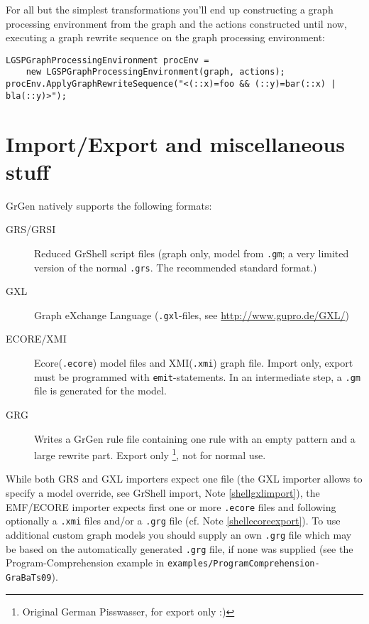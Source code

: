 \begin{example}
For all but the simplest transformations you'll end up constructing a graph processing environment from the graph and the actions constructed until now, executing a graph rewrite sequence on the graph processing environment:
\begin{verbatim}
LGSPGraphProcessingEnvironment procEnv = 
    new LGSPGraphProcessingEnvironment(graph, actions);
procEnv.ApplyGraphRewriteSequence("<(::x)=foo && (::y)=bar(::x) | bla(::y)>");
\end{verbatim}
\end{example}

\section{Import/Export and miscellaneous stuff}\label{sub:imexport}

GrGen natively supports the following formats:
\begin{description}
  \item[GRS/GRSI] Reduced GrShell script files (graph only, model from \texttt{.gm}; a very limited version of the normal \texttt{.grs}. The recommended standard format.)
  \item[GXL] Graph eXchange Language (\texttt{.gxl}-files, see \url{http://www.gupro.de/GXL/})
  \item[ECORE/XMI] Ecore(\texttt{.ecore}) model files and XMI(\texttt{.xmi}) graph file. Import only, export must be programmed with \texttt{emit}-statements. In an intermediate step, a \texttt{.gm} file is generated for the model.
    \item[GRG] Writes a GrGen rule file containing one rule with an empty pattern and a large rewrite part. Export only \footnote{Original German Pisswasser, for export only :)}, not for normal use.
\end{description}

While both GRS and GXL importers expect one file
(the GXL importer allows to specify a model override, see GrShell import, Note \ref{shellgxlimport}),
the EMF/ECORE importer expects first one or more \texttt{.ecore} files
and following optionally a \texttt{.xmi} files and/or a \texttt{.grg} file (cf. Note \ref{shellecoreexport}). 
To use additional custom graph models you should supply an own \texttt{.grg}
file which may be based on the automatically generated \texttt{.grg} file, if none was
supplied (see the Program-Comprehension example in \texttt{examples/ProgramComprehension-GraBaTs09}).

